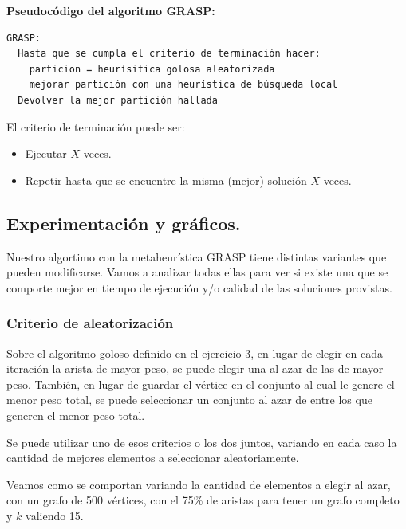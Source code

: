 \vspace*{0.35cm}

\textbf{Pseudocódigo del algoritmo GRASP:}

\vspace*{0.1cm}

\begin{verbatim}
GRASP:
  Hasta que se cumpla el criterio de terminación hacer:
    particion = heurísitica golosa aleatorizada
    mejorar partición con una heurística de búsqueda local
  Devolver la mejor partición hallada
\end{verbatim}

El criterio de terminación puede ser:
\begin{itemize}
  \item Ejecutar $X$ veces.
  \item Repetir hasta que se encuentre la misma (mejor) solución $X$ veces.
\end{itemize}

\newpage
\subsection{Experimentación y gráficos.}
\vspace*{0.3cm}

Nuestro algortimo con la metaheurística GRASP tiene distintas variantes que
pueden modificarse. Vamos a analizar todas ellas para ver si existe una que
se comporte mejor en tiempo de ejecución y/o calidad de las soluciones
provistas.

\subsubsection{Criterio de aleatorización}

Sobre el algoritmo goloso definido en el ejercicio 3, en lugar de elegir en cada
iteración la arista de mayor peso, se puede elegir una al azar de las de mayor
peso. También, en lugar de guardar el vértice en el conjunto al cual le genere
el menor peso total, se puede seleccionar un conjunto al azar de entre los que
generen el menor peso total.

Se puede utilizar uno de esos criterios o los dos juntos, variando en cada
caso la cantidad de mejores elementos a seleccionar aleatoriamente.

Veamos como se comportan variando la cantidad de elementos a elegir al azar,
con un grafo de 500 vértices, con el 75\% de aristas para tener un grafo
completo y $k$ valiendo 15.
\vspace*{0.5cm}

